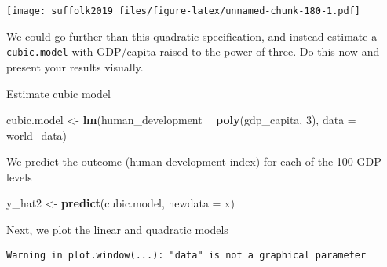 \documentclass[]{article}
\newenvironment{Shaded}{\begin{snugshade}}{\end{snugshade}}
\newcommand{\DataTypeTok}[1]{\textcolor[rgb]{0.13,0.29,0.53}{#1}}
\newcommand{\DecValTok}[1]{\textcolor[rgb]{0.00,0.00,0.81}{#1}}
\newcommand{\KeywordTok}[1]{\textcolor[rgb]{0.13,0.29,0.53}{\textbf{#1}}}
\newcommand{\NormalTok}[1]{#1}
\newcommand{\OperatorTok}[1]{\textcolor[rgb]{0.81,0.36,0.00}{\textbf{#1}}}
\newcommand{\OtherTok}[1]{\textcolor[rgb]{0.56,0.35,0.01}{#1}}
\newcommand{\StringTok}[1]{\textcolor[rgb]{0.31,0.60,0.02}{#1}}
\begin{document}
\texttt{[image: suffolk2019\_files/figure-latex/unnamed-chunk-180-1.pdf]}

We could go further than this quadratic specification, and instead estimate a \texttt{cubic.model} with GDP/capita raised to the power of three. Do this now and present your results visually.

Estimate cubic model

\begin{Shaded}
\begin{Highlighting}[]
\NormalTok{cubic.model <-}\StringTok{ }\KeywordTok{lm}\NormalTok{(human_development }\OperatorTok{~}\StringTok{ }\KeywordTok{poly}\NormalTok{(gdp_capita, }\DecValTok{3}\NormalTok{), }\DataTypeTok{data =}\NormalTok{ world_data)}
\end{Highlighting}
\end{Shaded}

We predict the outcome (human development index) for each of the 100 GDP levels

\begin{Shaded}
\begin{Highlighting}[]
\NormalTok{y_hat2 <-}\StringTok{ }\KeywordTok{predict}\NormalTok{(cubic.model, }\DataTypeTok{newdata =}\NormalTok{ x)}
\end{Highlighting}
\end{Shaded}

Next, we plot the linear and quadratic models

\begin{Shaded}
\end{Shaded}

\begin{verbatim}
Warning in plot.window(...): "data" is not a graphical parameter
\end{verbatim}
\end{document}
